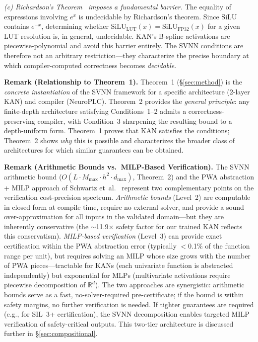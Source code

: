 \begin{remark}
\vspace{2pt}
\noindent\textit{(c) Richardson's Theorem~\cite{richardson1969decidability}
imposes a fundamental barrier.}
The equality of expressions involving $e^x$ is undecidable by
Richardson's theorem. Since SiLU contains $e^{-x}$, determining whether
$\text{SiLU}_{\text{LUT}}(x) = \text{SiLU}_{\text{FP32}}(x)$ for a given LUT
resolution is, in general, undecidable. KAN's B-spline activations are
piecewise-polynomial and avoid this barrier entirely. The SVNN conditions
are therefore not an arbitrary restriction---they characterize the precise
boundary at which compiler-computed correctness becomes \textit{decidable}.
\end{remark}

\vspace{4pt}
\noindent\textbf{Remark (Relationship to Theorem~1).}
Theorem~1 ({\S}\ref{sec:method}) is the \textit{concrete instantiation}
of the SVNN framework for a specific architecture (2-layer KAN) and
compiler (NeuroPLC). Theorem~2 provides the \textit{general principle}:
any finite-depth architecture satisfying Conditions~1--2 admits a
correctness-preserving compiler, with Condition~3 sharpening the resulting
bound to a depth-uniform form. Theorem~1 proves that KAN satisfies the
conditions; Theorem~2 shows \textit{why} this is possible and characterizes
the broader class of architectures for which similar guarantees can be obtained.

\vspace{4pt}
\noindent\textbf{Remark (Arithmetic Bounds vs.\ MILP-Based Verification).}
The SVNN arithmetic bound ($O(L \cdot M_{\max} \cdot h^2 \cdot d_{\max})$, Theorem~2)
and the PWA abstraction + MILP approach of Schwartz
et~al.~\cite{schwartz2026optimal} represent two complementary points on
the verification cost-precision spectrum. \textit{Arithmetic bounds}
(Level~2) are computable in closed form at compile time, require no
external solver, and provide a sound over-approximation for all inputs
in the validated domain---but they are inherently conservative (the
$\sim$11.9$\times$ safety factor for our trained KAN reflects this
conservatism). \textit{MILP-based verification} (Level~3) can provide
exact certification within the PWA abstraction error (typically
$<$0.1\% of the function range per unit), but requires solving an
MILP whose size grows with the number of PWA pieces---tractable for
KANs (each univariate function is abstracted independently) but
exponential for MLPs (multivariate activations require piecewise
decomposition of $\mathbb{R}^d$). The two approaches are synergistic:
arithmetic bounds serve as a fast, no-solver-required pre-certificate;
if the bound is within safety margins, no further verification is
needed. If tighter guarantees are required (e.g., for SIL~3+
certification), the SVNN decomposition enables targeted MILP
verification of safety-critical outputs. This two-tier architecture is
discussed further in {\S}\ref{sec:compositional}.




